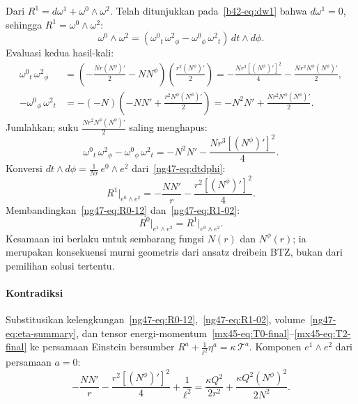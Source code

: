 Dari $R^1 = d\omega^1 + \omega^0 \wedge \omega^2$. Telah ditunjukkan pada~\eqref{b42-eq:dw1} bahwa $d\omega^1 = 0$, sehingga $R^1 = \omega^0 \wedge \omega^2$:
\begin{equation}
    \omega^0 \wedge \omega^2 = (\omega^0{}_t\,\omega^2{}_\phi - \omega^0{}_\phi\,\omega^2{}_t)\,dt \wedge d\phi.
\end{equation}
Evaluasi kedua hasil-kali:
\begin{align}
    \omega^0{}_t\,\omega^2{}_\phi
    &= \left(-\frac{Nr(N^\phi)'}{2} - NN^\phi\right)\!\left(\frac{r^2(N^\phi)'}{2}\right)
    = -\frac{Nr^3[(N^\phi)']^2}{4} - \frac{Nr^2N^\phi(N^\phi)'}{2}, \\[4pt]
    -\omega^0{}_\phi\,\omega^2{}_t
    &= -(-N)\!\left(-NN' + \frac{r^2N^\phi(N^\phi)'}{2}\right)
    = -N^2N' + \frac{Nr^2N^\phi(N^\phi)'}{2}.
\end{align}
Jumlahkan; suku $\frac{Nr^2N^\phi(N^\phi)'}{2}$ saling menghapus:
\begin{equation}
    \omega^0{}_t\,\omega^2{}_\phi - \omega^0{}_\phi\,\omega^2{}_t
    = -N^2N' - \frac{Nr^3[(N^\phi)']^2}{4}.
\end{equation}
Konversi $dt \wedge d\phi = \frac{1}{Nr}\,e^0 \wedge e^2$ dari~\eqref{ng47-eq:dtdphi}:
\begin{equation}\label{ng47-eq:R1-02}
    R^1\big|_{e^0 \wedge e^2} = -\frac{NN'}{r} - \frac{r^2[(N^\phi)']^2}{4}.
\end{equation}
Membandingkan~\eqref{ng47-eq:R0-12} dan~\eqref{ng47-eq:R1-02}:
\begin{equation}\label{ng47-eq:R-equal}
    R^0\big|_{e^1 \wedge e^2} = R^1\big|_{e^0 \wedge e^2}.
\end{equation}
Kesamaan ini berlaku untuk sembarang fungsi $N(r)$ dan $N^\phi(r)$; ia merupakan konsekuensi murni geometris dari ansatz dreibein BTZ, bukan dari pemilihan solusi tertentu.

\paragraph{Kontradiksi}

\noindent

Substitusikan kelengkungan~\eqref{ng47-eq:R0-12},~\eqref{ng47-eq:R1-02}, volume~\eqref{ng47-eq:eta-summary}, dan tensor energi-momentum~\eqref{mx45-eq:T0-final}--\eqref{mx45-eq:T2-final} ke persamaan Einstein bersumber $R^a + \frac{1}{\ell^2}\eta^a = \kappa\,\mathcal{T}^a$.
Komponen $e^1 \wedge e^2$ dari persamaan $a = 0$:
\begin{equation}\label{ng47-eq:E0}
    -\frac{NN'}{r} - \frac{r^2[(N^\phi)']^2}{4} + \frac{1}{\ell^2}
    = \frac{\kappa Q^2}{2r^2} + \frac{\kappa Q^2(N^\phi)^2}{2N^2}.
\end{equation}

